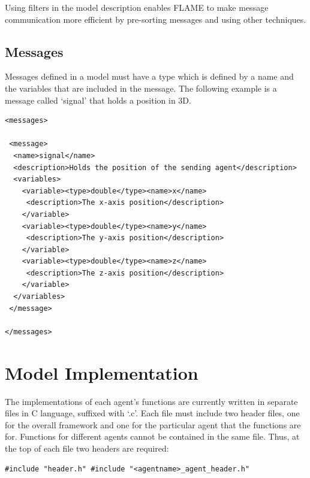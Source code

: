 \documentclass[a4paper,11pt]{article}
\newenvironment{mylisting}
{\begin{list}{}{\setlength{\leftmargin}{1em}}\item\small\bfseries}
{\end{list}}
\begin{document}
Using filters in the model description enables FLAME to make message
communication more efficient by pre-sorting messages and using other
techniques.


\subsection{Messages}

Messages defined in a model must have a type which is defined by a
name and the variables that are included in the message. The
following example is a message called `signal' that holds a position
in 3D.

\begin{mylisting}
\begin{verbatim}
<messages>

 <message>
  <name>signal</name>
  <description>Holds the position of the sending agent</description>
  <variables>
    <variable><type>double</type><name>x</name>
     <description>The x-axis position</description>
    </variable>
    <variable><type>double</type><name>y</name>
     <description>The y-axis position</description>
    </variable>
    <variable><type>double</type><name>z</name>
     <description>The z-axis position</description>
    </variable>
  </variables>
 </message>

</messages>
\end{verbatim}
\end{mylisting}


\section{Model Implementation}
\label{model_implementation}

The implementations of each agent's functions are currently written
in separate files in C language, suffixed with `.c'. Each file must
include two header files, one for the overall framework and one for
the particular agent that the functions are for. Functions for
different agents cannot be contained in the same file. Thus, at the
top of each file two headers are required:

\begin{mylisting}
\begin{verbatim}
#include "header.h" #include "<agentname>_agent_header.h"
\end{verbatim}
\end{mylisting}
\end{document}
